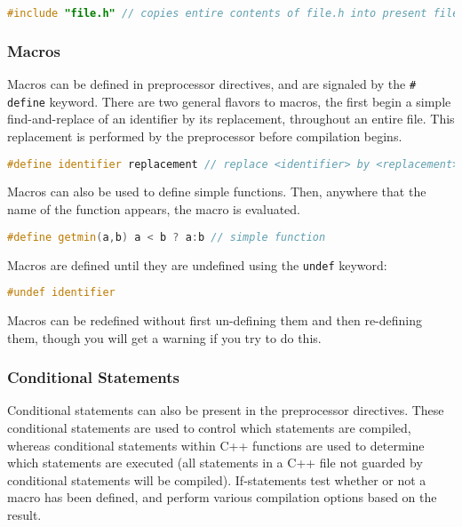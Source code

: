 \documentclass[10pt]{article}
\begin{document}
\begin{lstlisting}[language=C++]
#include "file.h" // copies entire contents of file.h into present file
\end{lstlisting}

\subsubsection{Macros}

Macros can be defined in preprocessor directives, and are signaled by the \texttt{\# define} keyword. There are two general flavors to macros, the first begin a simple find-and-replace of an identifier by its replacement, throughout an entire file. This replacement is performed by the preprocessor before compilation begins.

\begin{lstlisting}[language=C++]
#define identifier replacement // replace <identifier> by <replacement>
\end{lstlisting}

Macros can also be used to define simple functions. Then, anywhere that the name of the function appears, the macro is evaluated. 

\begin{lstlisting}[language=C++]
#define getmin(a,b) a < b ? a:b // simple function
\end{lstlisting}

Macros are defined until they are undefined using the \texttt{undef} keyword:

\begin{lstlisting}[language=C++]
#undef identifier
\end{lstlisting}

Macros can be redefined without first un-defining them and then re-defining them, though you will get a warning if you try to do this.

\subsubsection{Conditional Statements}

Conditional statements can also be present in the preprocessor directives. These conditional statements are used to control which statements are compiled, whereas conditional statements within C++ functions are used to determine which statements are executed (all statements in a C++ file not guarded by conditional statements will be compiled). If-statements test whether or not a macro has been defined, and perform various compilation options based on the result.
\end{document}
